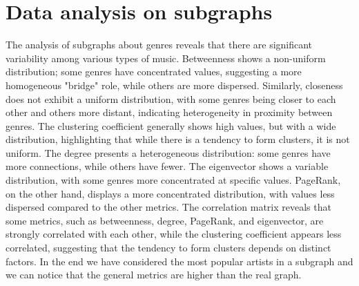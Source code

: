 \section{Data analysis on subgraphs}
The analysis of subgraphs about genres reveals that there are significant variability among various types of music. 
Betweenness shows a non-uniform distribution; some genres have concentrated values, suggesting a more homogeneous "bridge" role, while others are more dispersed. 
Similarly, closeness does not exhibit a uniform distribution, with some genres being closer to each other and others more distant, indicating heterogeneity in proximity between genres. 
The clustering coefficient generally shows high values, but with a wide distribution, highlighting that while there is a tendency to form clusters, it is not uniform. The degree presents a heterogeneous distribution: some genres have more connections, while others have fewer. 
The eigenvector shows a variable distribution, with some genres more concentrated at specific values. PageRank, on the other hand, displays a more concentrated distribution, with values less dispersed compared to the other metrics. 
The correlation matrix reveals that some metrics, such as betweenness, degree, PageRank, and eigenvector, are strongly correlated with each other, while the clustering coefficient appears less correlated, suggesting that the tendency to form clusters depends on distinct factors.
In the end we have considered the most popular artists in a subgraph and we can notice that the general metrics are higher than the real graph.
